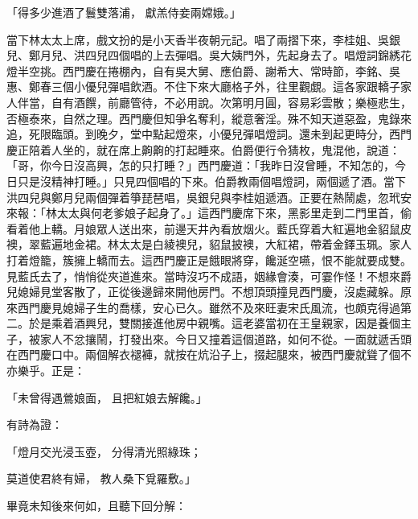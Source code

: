 「得多少進酒了鬟雙落浦，  獻羔侍妾兩嫦娥。」

當下林太太上席，戲文扮的是小天香半夜朝元記。唱了兩摺下來，李桂姐、吳銀兒、鄭月兒、洪四兒四個唱的上去彈唱。吳大姨門外，先起身去了。唱燈詞錦綉花燈半空挑。西門慶在捲棚內，自有吳大舅、應伯爵、謝希大、常時節，李銘、吳惠、鄭春三個小優兒彈唱飲酒。不住下來大廳格子外，往里觀覷。這各家跟轎子家人伴當，自有酒饌，前廳管待，不必用說。次第明月圓，容易彩雲散；樂極悲生，否極泰來，自然之理。西門慶但知爭名奪利，縱意奢淫。殊不知天道惡盈，鬼錄來追，死限臨頭。到晚夕，堂中點起燈來，小優兒彈唱燈詞。還未到起更時分，西門慶正陪着人坐的，就在席上齁齁的打起睡來。伯爵便行令猜枚，鬼混他，說道：「哥，你今日沒高興，怎的只打睡？」西門慶道：「我昨日沒曾睡，不知怎的，今日只是沒精神打睡。」只見四個唱的下來。伯爵教兩個唱燈詞，兩個遞了酒。當下洪四兒與鄭月兒兩個彈着箏琵琶唱，吳銀兒與李桂姐遞酒。正要在熱鬧處，忽玳安來報：「林太太與何老爹娘子起身了。」這西門慶席下來，黑影里走到二門里首，偷看着他上轎。月娘眾人送出來，前邊天井內看放烟火。藍氏穿着大紅遍地金貂鼠皮襖，翠藍遍地金裙。林太太是白綾襖兒，貂鼠披襖，大紅裙，帶着金鐸玉珮。家人打着燈籠，簇擁上轎而去。這西門慶正是餓眼將穿，饞涎空嚥，恨不能就要成雙。見藍氏去了，悄悄從夾道進來。當時沒巧不成語，姻緣會湊，可霎作怪！不想來爵兒媳婦見堂客散了，正從後邊歸來開他房門。不想頂頭撞見西門慶，沒處藏躲。原來西門慶見媳婦子生的喬樣，安心已久。雖然不及來旺妻宋氏風流，也頗克得過第二。於是乘着酒興兒，雙關接進他房中親嘴。這老婆當初在王皇親家，因是養個主子，被家人不忿攘鬧，打發出來。今日又撞着這個道路，如何不從。一面就遞舌頭在西門慶口中。兩個解衣褪褲，就按在炕沿子上，掇起腿來，被西門慶就聳了個不亦樂乎。正是：

「未曾得遇鶯娘面，  且把紅娘去解饞。」

有詩為證：

「燈月交光浸玉壺，  分得清光照綠珠；

莫道使君終有婦，  教人桑下覓羅敷。」

畢竟未知後來何如，且聽下回分解：


